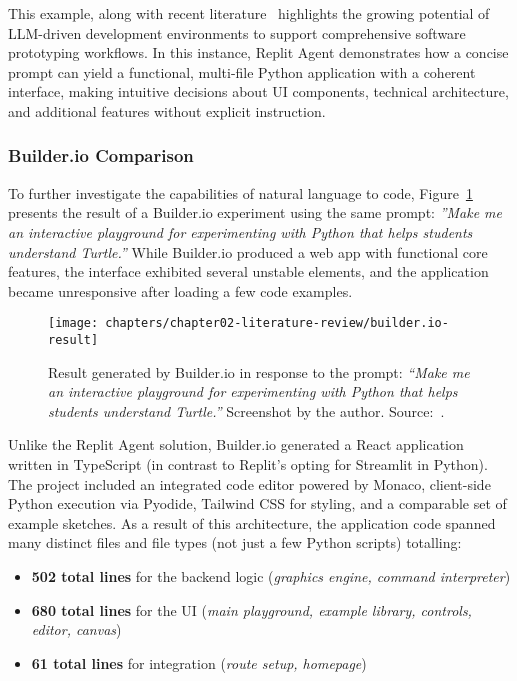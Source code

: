 This example, along with recent literature~\cite{day_get_2025, gadde_democratizing_2025, sapkota_vibe_2025} highlights the growing potential of LLM-driven development environments to support comprehensive software prototyping workflows. In this instance, Replit Agent demonstrates how a concise prompt can yield a functional, multi-file Python application with a coherent interface, making intuitive decisions about UI components, technical architecture, and additional features without explicit instruction.

\subsubsection{Builder.io Comparison}

To further investigate the capabilities of natural language to code, Figure~\ref{fig:builder.io-result} presents the result of a Builder.io experiment using the same prompt: \textit{''Make me an interactive playground for experimenting with Python that helps students understand Turtle.''} While Builder.io produced a web app with functional core features, the interface exhibited several unstable elements, and the application became unresponsive after loading a few code examples.

\begin{figure}[!htbp]
\centering
\texttt{[image: chapters/chapter02-literature-review/builder.io-result]}
\caption{Result generated by Builder.io in response to the prompt: \textit{``Make me an interactive playground for experimenting with Python that helps students understand Turtle.''} Screenshot by the author. Source:~\cite{builderio_inc_builderio_2025}.}
\label{fig:builder.io-result}
\end{figure}

Unlike the Replit Agent solution, Builder.io generated a React application written in TypeScript (in contrast to Replit's opting for Streamlit in Python). The project included an integrated code editor powered by Monaco, client-side Python execution via Pyodide, Tailwind CSS for styling, and a comparable set of example sketches. As a result of this architecture, the application code spanned many distinct files and file types (not just a few Python scripts) totalling:

\begin{itemize}
  \item \textbf{502 total lines} for the backend logic (\textit{graphics engine, command interpreter})
  \item \textbf{680 total lines} for the UI (\textit{main playground, example library, controls, editor, canvas})
  \item \textbf{61 total lines} for integration (\textit{route setup, homepage})
\end{itemize}

